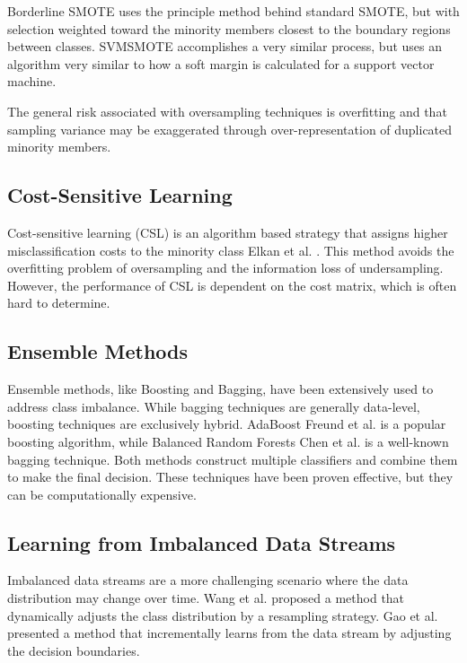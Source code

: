 \documentclass[journal]{IEEEtran}
\begin{document}
		Borderline SMOTE \cite{han2005} uses the principle method behind standard SMOTE, but with selection weighted toward the minority members closest to the boundary regions between classes. SVMSMOTE \cite{nguyen2011} accomplishes a very similar process, but uses an algorithm very similar to how a soft margin is calculated for a support vector machine.
	
		The general risk associated with oversampling techniques is overfitting and that sampling variance may be exaggerated through over-representation of duplicated minority members.
	
		\subsection{Cost-Sensitive Learning}
		
		Cost-sensitive learning (CSL) is an algorithm based strategy that assigns higher misclassification costs to the minority class Elkan et al. \cite{elkan2001}. This method avoids the overfitting problem of oversampling and the information loss of undersampling. However, the performance of CSL is dependent on the cost matrix, which is often hard to determine.
		
		\subsection{Ensemble Methods} 
		
		Ensemble methods, like Boosting and Bagging, have been extensively used to address class imbalance. While bagging techniques are generally data-level, boosting techniques are exclusively hybrid.
		AdaBoost Freund et al. \cite{freund1997} is a popular boosting algorithm, while Balanced Random Forests Chen et al. \cite{chen2004} is a well-known bagging technique. Both methods construct multiple classifiers and combine them to make the final decision. These techniques have been proven effective, but they can be computationally expensive.
		
		\subsection{Learning from Imbalanced Data Streams} 
		
		Imbalanced data streams are a more challenging scenario where the data distribution may change over time. Wang et al. \cite{wang2018} proposed a method that dynamically adjusts the class distribution by a resampling strategy. Gao et al. \cite{gao2015} presented a method that incrementally learns from the data stream by adjusting the decision boundaries.
		
\end{document}
